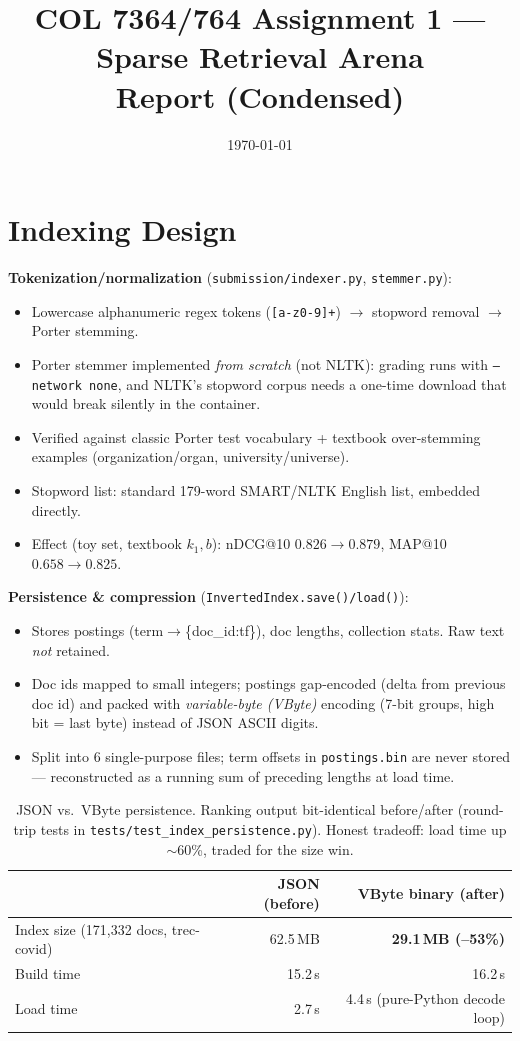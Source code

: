 \documentclass[10pt]{article}
\title{COL 7364/764 Assignment 1 --- Sparse Retrieval Arena \\ \large Report (Condensed)}
\author{\todo{name and registration number}}
\date{\today}
\begin{document}
\maketitle
\vspace{-1.5em}

\section{Indexing Design}

\textbf{Tokenization/normalization} (\texttt{submission/indexer.py}, \texttt{stemmer.py}):
\begin{itemize}
\item Lowercase alphanumeric regex tokens (\texttt{[a-z0-9]+}) $\to$ stopword removal $\to$ Porter stemming.
\item Porter stemmer implemented \emph{from scratch} (not NLTK): grading runs with \texttt{--network none}, and NLTK's stopword corpus needs a one-time download that would break silently in the container.
\item Verified against classic Porter test vocabulary + textbook over-stemming examples (organization/organ, university/universe).
\item Stopword list: standard 179-word SMART/NLTK English list, embedded directly.
\item Effect (toy set, textbook $k_1,b$): nDCG@10 $0.826\to0.879$, MAP@10 $0.658\to0.825$.
\end{itemize}

\textbf{Persistence \& compression} (\texttt{InvertedIndex.save()/load()}):
\begin{itemize}
\item Stores postings (term$\to$\{doc\_id:tf\}), doc lengths, collection stats. Raw text \emph{not} retained.
\item Doc ids mapped to small integers; postings gap-encoded (delta from previous doc id) and packed with \emph{variable-byte (VByte)} encoding (7-bit groups, high bit = last byte) instead of JSON ASCII digits.
\item Split into 6 single-purpose files; term offsets in \texttt{postings.bin} are never stored --- reconstructed as a running sum of preceding lengths at load time.
\end{itemize}

\begin{table}[h]
\centering\small
\begin{tabular}{lrr}
\toprule
 & JSON (before) & VByte binary (after) \\
\midrule
Index size (171{,}332 docs, trec-covid) & 62.5\,MB & \textbf{29.1\,MB (--53\%)} \\
Build time & 15.2\,s & 16.2\,s \\
Load time & 2.7\,s & 4.4\,s (pure-Python decode loop) \\
\bottomrule
\end{tabular}
\caption{JSON vs.\ VByte persistence. Ranking output bit-identical before/after (round-trip tests in \texttt{tests/test\_index\_persistence.py}). Honest tradeoff: load time up $\sim$60\%, traded for the size win.}
\end{table}
\end{document}
